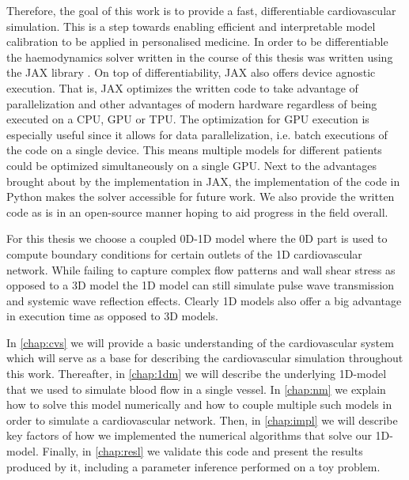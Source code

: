 \documentclass[a4paper, oneside]{discothesis}
\begin{document}
Therefore, the goal of this work is to provide a fast, differentiable cardiovascular simulation.
This is a step towards enabling efficient and interpretable model calibration to be applied in personalised medicine.
In order to be differentiable the haemodynamics solver written in the course of this thesis was written using the JAX library \cite{jax}.
On top of differentiability, JAX also offers device agnostic execution.
That is, JAX optimizes the written code to take advantage of parallelization and other advantages of modern hardware regardless of being executed on a CPU, GPU or TPU.
The optimization for GPU execution is especially useful since it allows for data parallelization, i.e. batch executions of the code on a single device.
This means multiple models for different patients could be optimized simultaneously on a single GPU.
Next to the advantages brought about by the implementation in JAX, the implementation of the code in Python makes the solver accessible for future work.
We also provide the written code as is in an open-source manner hoping to aid progress in the field overall.

For this thesis we choose a coupled 0D-1D model where the 0D part is used to compute boundary conditions for certain outlets of the 1D cardiovascular network.
While failing to capture complex flow patterns and wall shear stress as opposed to a 3D model the 1D model can still simulate pulse wave transmission and systemic wave reflection effects.
Clearly 1D models also offer a big advantage in execution time as opposed to 3D models. \cite{shi2011review,pfaller2020using,arzani2022machine} 

In \autoref{chap:cvs} we will provide a basic understanding of the cardiovascular system which will serve as a base for describing the cardiovascular simulation throughout this work.
Thereafter, in \autoref{chap:1dm} we will describe the underlying 1D-model that we used to simulate blood flow in a single vessel.
In \autoref{chap:nm} we explain how to solve this model numerically and how to couple multiple such models in order to simulate a cardiovascular network.
Then, in \autoref{chap:impl}  we will describe key factors of how we implemented the numerical algorithms that solve our 1D-model.
Finally, in \autoref{chap:resl} we validate this code and present the results produced by it, including a parameter inference performed on a toy problem.



\end{document}
